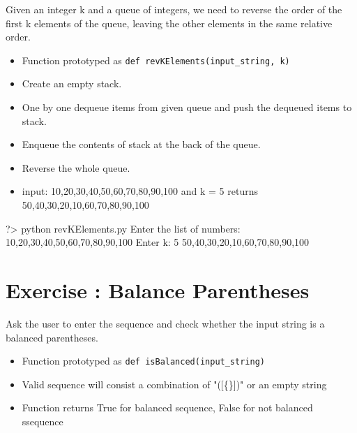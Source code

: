 \documentclass{42-en}
\begin{document}
\exnumber{\exercicenumber}

\makeheaderfiles

Given an integer k and a queue of integers, we need to reverse the order of the first k elements
of the queue, leaving the other elements in the same relative order.\\

		\begin{itemize}\itemsep1pt
			\item Function prototyped as \texttt{def revKElements(input\_string, k)}
			\item Create an empty stack.
			\item One by one dequeue items from given queue and push the dequeued items to stack.
			\item Enqueue the contents of stack at the back of the queue.
			\item Reverse the whole queue.
			\item input: 10,20,30,40,50,60,70,80,90,100 and k = 5 returns 50,40,30,20,10,60,70,80,90,100
        	\end{itemize}

		\begin{42console}
			?> python revKElements.py
			Enter the list of numbers: 10,20,30,40,50,60,70,80,90,100
			Enter k: 5
			50,40,30,20,10,60,70,80,90,100
		\end{42console}

\chapter{Exercise \exercicenumber: Balance Parentheses}

\exnumber{\exercicenumber}

\makeheaderfiles

Ask the user to enter the sequence and check whether the input string is a balanced parentheses.

		\begin{itemize}\itemsep1pt
			\item Function prototyped as \texttt{def isBalanced(input\_string)}
			\item Valid sequence will consist a combination of "([\{\}])" or an empty string
			\item Function returns True for balanced sequence, False for not balanced ssequence
        	\end{itemize}
	
\end{document}
